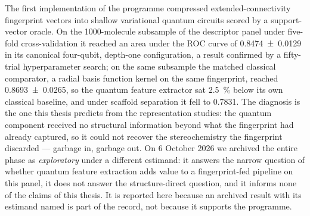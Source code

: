 The first implementation of the programme compressed extended-connectivity fingerprint vectors into shallow variational quantum circuits scored by a support-vector oracle. On the \num{1000}-molecule subsample of the descriptor panel under five-fold cross-validation it reached an area under the ROC curve of \num{0.8474 \pm 0.0129} in its canonical four-qubit, depth-one configuration, a result confirmed by a fifty-trial hyperparameter search; on the same subsample the matched classical comparator, a radial basis function kernel on the same fingerprint, reached \num{0.8693 \pm 0.0265}, so the quantum feature extractor sat \qty{2.5}{\percent} below its own classical baseline, and under scaffold separation it fell to \num{0.7831}. The diagnosis is the one this thesis predicts from the representation studies: the quantum component received no structural information beyond what the fingerprint had already captured, so it could not recover the stereochemistry the fingerprint discarded --- garbage in, garbage out. On 6 October 2026 we archived the entire phase as \emph{exploratory} under a different estimand: it answers the narrow question of whether quantum feature extraction adds value to a fingerprint-fed pipeline on this panel, it does not answer the structure-direct question, and it informs none of the claims of this thesis. It is reported here because an archived result with its estimand named is part of the record, not because it supports the programme.

